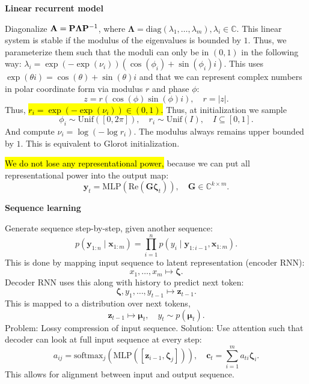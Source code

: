 \documentclass[10pt]{article}
\newenvironment{topic}[1]
{\textbf{\sffamily \footnotesize \colorbox{black}{\rlap{\textbf{\textcolor{white}{#1}}}\hspace{\linewidth}\hspace{-2\fboxsep}}}}
{}
\newenvironment{subtopic}[1]
{\begin{center}\textbf{\footnotesize \sffamily #1}\end{center}}
{}
\renewcommand{\mat}[1]{\ensuremath{\mathbf{#1}}}
\renewcommand{\vec}[1]{\ensuremath{\mathbold{#1}}}
\newcommand{\Break}{\vfill\null\columnbreak}
\begin{document}
\begin{multicols*}{3}
\begin{topic}{Recurrent neural networks}
\begin{subtopic}{Linear recurrent model}
            Diagonalize $\mat{A} = \mat{P}\mat{\Lambda}\inv{\mat{P}}$, where $\mat{\Lambda} =
                \mathrm{diag}(\lambda_1, \ldots, \lambda_m), \lambda_i \in \mathbb{C}$. This linear system is
            stable if the modulus of the eigenvalues is bounded by $1$. Thus, we parameterize them such that
            the moduli can only be in $(0,1)$ in the following way: $\lambda_i = \exp(-\exp(\nu_i))(\cos(\phi_i) + \sin(\phi_i)i)$.
            This uses $\exp(\theta i) = \cos(\theta) + \sin(\theta)i$ and that we can represent complex numbers
            in polar coordinate form via modulus $r$ and phase $\phi$: \[
                z = r(\cos(\phi) \sin(\phi) i), \quad r = |z|.
            \]
            Thus, \hl{$r_i = \exp(-\exp(\nu_i)) \in (0,1)$.} Thus, at initialization we sample \[
                \phi_i \sim \mathrm{Unif}([0,2\pi]), \quad r_i \sim \mathrm{Unif}(I), \quad I \subseteq [0,1].
            \]
            And compute $\nu_i = \log(-\log r_i)$. The modulus always remains upper bounded by $1$. This is
            equivalent to Glorot initialization.

            \hl{We do not lose any representational power,} because we can put all representational power into the
            output map: \[
                \vec{y}_t = \mathrm{MLP}(\mathrm{Re}(\mat{G}\vec{\zeta}_t)), \quad \mat{G} \in \mathbb{C}^{k \times m}.
            \]
        \end{subtopic}

        \Break

        \begin{subtopic}{Sequence learning}
            Generate sequence step-by-step, given another sequence: \[
                p(\vec{y}_{1:n} \mid \vec{x}_{1:m}) = \prod_{i=1}^n p(y_i \mid \vec{y}_{1:i-1}, \vec{x}_{1:m}).
            \]
            This is done by mapping input sequence to latent representation (encoder RNN): \[
                x_1, \ldots, x_m \mapsto \vec{\zeta}.
            \]
            Decoder RNN uses this along with history to predict next token: \[
                \vec{\zeta}, y_1, \ldots, y_{t-1} \mapsto \vec{z}_{t-1}.
            \]
            This is mapped to a distribution over next tokens, \[
                \vec{z}_{t-1} \mapsto \vec{\mu}_t, \quad y_t \sim p(\vec{\mu}_t).
            \]
            Problem: Lossy compression of input sequence. Solution: Use attention such that decoder can look at
            full input sequence at every step: \[
                a_{ij} = \mathrm{softmax}_j(\mathrm{MLP}([\vec{z}_{i-1}, \vec{\zeta}_j])), \quad \vec{c}_t = \sum_{i=1}^{m} a_{ti} \vec{\zeta}_i.
            \]
            This allows for alignment between input and output sequence.


\end{subtopic}
\end{topic}
\end{multicols*}
\end{document}
